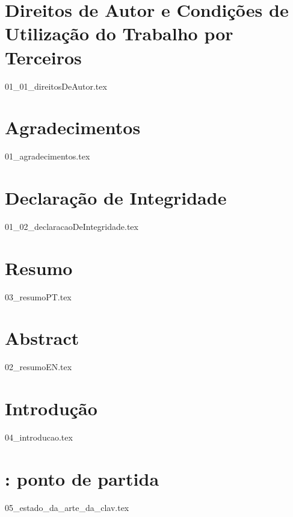 \documentclass[
  oneside,
  12pt, a4paper,
  footinclude=true,
  headinclude=true,
  cleardoublepage=empty
]{scrbook}
\author{José Carlos Lima Martins}
\date{\myear} %
\begin{document}
    \umfrontcover{}
    \umtitlepage{}
	
    \chapter*{Direitos de Autor e Condições de Utilização do Trabalho por Terceiros}
    {01_01_direitosDeAutor.tex}

	\chapter*{Agradecimentos}
    {01_agradecimentos.tex}

    \chapter*{Declaração de Integridade}
    {01_02_declaracaoDeIntegridade.tex}

	\chapter*{Resumo}
    {03_resumoPT.tex}

    \cleardoublepage{}

	\chapter*{Abstract}
    {02_resumoEN.tex}
	
	\tableofcontents
	\listoffigures
	\listoftables
	\lstlistoflistings
    \printglossary[type=\acronymtype, title={Lista de Acrónimos}, style=treenoname]
	
    \cleardoublepage{}
	
    \chapter{Introdução}
    {04_introducao.tex}

    \chapter{: ponto de partida}
    {05_estado_da_arte_da_clav.tex}
\end{document}
